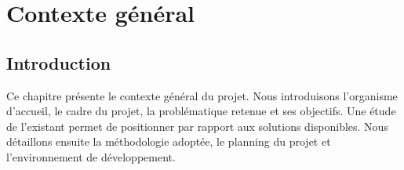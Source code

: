 %
%
%

\chapter{Contexte général}

\section{Introduction}

Ce chapitre présente le contexte général du projet. Nous introduisons l'organisme d'accueil,
le cadre du projet, la problématique retenue et ses objectifs. Une étude de l'existant permet
de positionner \tynassit{} par rapport aux solutions disponibles. Nous détaillons ensuite
la méthodologie adoptée, le planning du projet et l'environnement de développement.


